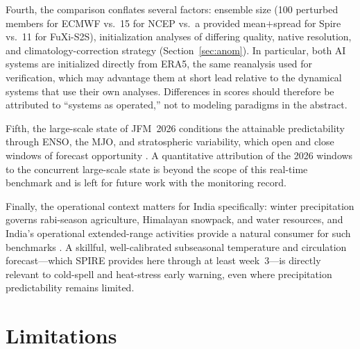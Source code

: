 \documentclass[11pt]{article}
\begin{document}
Fourth, the comparison conflates several factors: ensemble size
(100 perturbed members for ECMWF vs.\ 15 for NCEP vs.\ a provided
mean$+$spread for Spire vs.\ 11 for FuXi-S2S), initialization analyses of
differing quality, native resolution, and climatology-correction
strategy (Section~\ref{sec:anom}). In particular, both AI systems are
initialized directly from ERA5, the same reanalysis used for
verification, which may advantage them at short lead relative to the
dynamical systems that use their own analyses. Differences in scores
should therefore be attributed to ``systems as operated,'' not to
modeling paradigms in the abstract.

Fifth, the large-scale state of JFM~2026 conditions the attainable
predictability through ENSO, the MJO, and stratospheric variability,
which open and close windows of forecast opportunity
\citep{mariotti2020,domeisen2022,wheelerhendon2004,zhang2005}. A
quantitative attribution of the 2026 windows to the concurrent
large-scale state is beyond the scope of this real-time benchmark and is
left for future work with the monitoring record.

Finally, the operational context matters for India specifically: winter
precipitation governs rabi-season agriculture, Himalayan snowpack, and
water resources, and India's operational extended-range activities
provide a natural consumer for such benchmarks
\citep{rao2019,pattanaik2019,dimri2015,hunt2018}. A skillful,
well-calibrated subseasonal temperature and circulation forecast---which
SPIRE provides here through at least week~3---is directly relevant to
cold-spell and heat-stress early warning, even where precipitation
predictability remains limited.

\section{Limitations}\label{sec:limitations}
\end{document}
